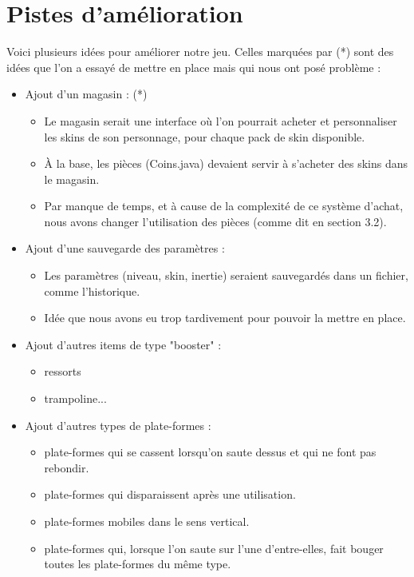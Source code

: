 \documentclass{article}
\begin{document}
\section{Pistes d'amélioration}
Voici plusieurs idées pour améliorer notre jeu. Celles marquées par (*) sont des idées que l'on a essayé de mettre en place mais qui nous ont posé problème :
\begin{itemize}
    \item Ajout d'un magasin : (*)
    \begin{itemize}
        \item Le magasin serait une interface où l'on pourrait acheter et personnaliser les skins de son personnage, pour chaque pack de skin disponible.
        \item À la base, les pièces (Coins.java) devaient servir à s'acheter des skins dans le magasin.
        \item Par manque de temps, et à cause de la complexité de ce système d'achat, nous avons changer l'utilisation des pièces (comme dit en section 3.2).
    \end{itemize}
    \item Ajout d'une sauvegarde des paramètres :
    \begin{itemize}
        \item Les paramètres (niveau, skin, inertie) seraient sauvegardés dans un fichier, comme l'historique.
        \item Idée que nous avons eu trop tardivement pour pouvoir la mettre en place.
    \end{itemize}
    \item Ajout d'autres items de type "booster" :
    \begin{itemize}
        \item ressorts
        \item trampoline...
    \end{itemize}
    \item Ajout d'autres types de plate-formes :
    \begin{itemize}
        \item plate-formes qui se cassent lorsqu'on saute dessus et qui ne font pas rebondir.
        \item plate-formes qui disparaissent après une utilisation.
        \item plate-formes mobiles dans le sens vertical.
        \item plate-formes qui, lorsque l'on saute sur l'une d'entre-elles, fait bouger toutes les plate-formes du même type.

\end{itemize}
\end{itemize}
\end{document}
